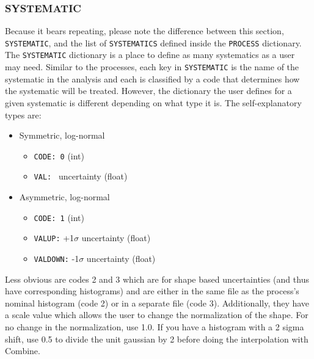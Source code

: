 \documentclass[letter]{article}
\begin{document}
        \subsubsection{SYSTEMATIC}
            Because it bears repeating, please note the difference between this section, \verb"SYSTEMATIC", and the list of \verb"SYSTEMATICS" defined inside the \verb"PROCESS" dictionary. The \verb"SYSTEMATIC" dictionary is a place to define as many systematics as a user may need. Similar to the processes, each key in \verb"SYSTEMATIC" is the name of the systematic in the analysis and each is classified by a code that determines how the systematic will be treated. However, the dictionary the user defines for a given systematic is different depending on what type it is. The self-explanatory types are:
            \begin{itemize}
                \item Symmetric, log-normal
                \begin{itemize}
                    \item \verb"CODE: 0" (int)
                    \item \verb"VAL: " uncertainty (float)
                \end{itemize}
                \item Asymmetric, log-normal
                \begin{itemize}
                    \item \verb"CODE: 1" (int)
                    \item \verb"VALUP:" +1$\sigma$ uncertainty (float)
                    \item \verb"VALDOWN:" -1$\sigma$ uncertainty (float)
                \end{itemize}
            \end{itemize}
            Less obvious are codes 2 and 3 which are for shape based uncertainties (and thus have corresponding histograms) and are either in the same file as the process's nominal histogram (code 2) or in a separate file (code 3). Additionally, they have a scale value which allows the user to change the normalization of the shape. For no change in the normalization, use 1.0. If you have a histogram with a 2 sigma shift, use 0.5 to divide the unit gaussian by 2 before doing the interpolation with Combine.
\end{document}
